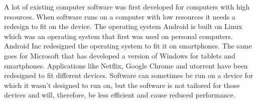 A lot of existing computer software was first developed for computers with high resources. When software runs on a computer with low resources it needs a redesign to fit on the device. The operating system Android is built on Linux which was an operating system that first was used on personal computers. Android Inc redesigned the operating system to fit it on smartphones. The same goes for Microsoft that has developed a version of Windows for tablets and smartphones. Applications like Netflix, Google Chrome and utorrent have been redesigned to fit different devices. Software can sometimes be run on a device for which it wasn't designed to run on, but the software is not tailored for those devices and will, therefore, be less efficient and cause reduced performance.

